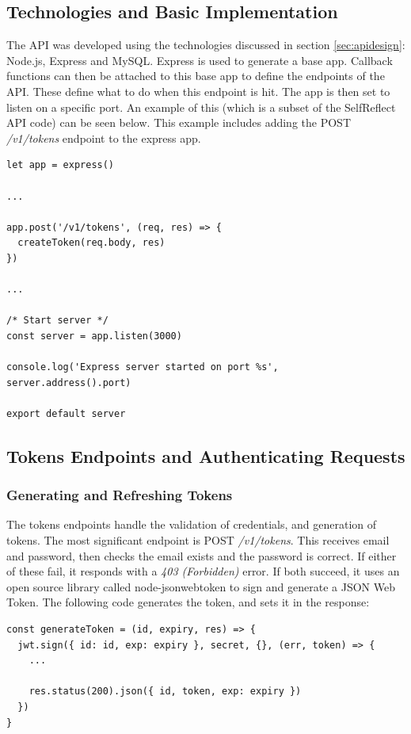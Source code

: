 \documentclass[11pt,openright,a4paper]{report}
\begin{document}
\subsection{Technologies and Basic Implementation}
The API was developed using the technologies discussed in section \ref{sec:apidesign}: Node.js, Express and MySQL. Express is used to generate a base app. Callback functions can then be attached to this base app to define the endpoints of the API. These define what to do when this endpoint is hit. The app is then set to listen on a specific port. An example of this (which is a subset of the SelfReflect API code) can be seen below. This example includes adding the POST \emph{/v1/tokens} endpoint to the express app.
\begin{lstlisting}
let app = express()

...

app.post('/v1/tokens', (req, res) => {
  createToken(req.body, res)
})

...

/* Start server */
const server = app.listen(3000)

console.log('Express server started on port %s', server.address().port)

export default server
\end{lstlisting}

\subsection{Tokens Endpoints and Authenticating Requests}
\subsubsection{Generating and Refreshing Tokens}
The tokens endpoints handle the validation of credentials, and generation of tokens. The most significant endpoint is POST \emph{/v1/tokens}. This receives email and password, then checks the email exists and the password is correct. If either of these fail, it responds with a \emph{403 (Forbidden)} error. If both succeed, it uses an open source library called node-jsonwebtoken \parencite{nodejwt} to sign and generate a JSON Web Token. The following code generates the token, and sets it in the response:
\begin{lstlisting}
const generateToken = (id, expiry, res) => {
  jwt.sign({ id: id, exp: expiry }, secret, {}, (err, token) => {
    ...

    res.status(200).json({ id, token, exp: expiry })
  })
}
\end{lstlisting}
\end{document}
